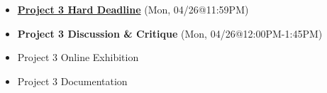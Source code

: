 \def\dMon{Mon, 04/26}
\def\dTues{Tues, 04/27}
\def\dWed{Wed, 04/28}
\def\dThur{Thur, 04/29}
\def\dFri{Fri, 04/30}
\def\dSat{Sat, 05/01}
\def\dSun{Sun, 05/02}
\placeDate





% 
\begin{itemize}[noitemsep,topsep=0pt,leftmargin=*]
    \item \textcolor{defaultColor}{\ul{\textbf{Project 3 Hard Deadline}} (\dMon @11:59PM)}
    \item \textcolor{defaultColor}{\textbf{Project 3 Discussion \& Critique} (\dMon @12:00PM-1:45PM)}
    \item Project 3 Online Exhibition
    \item Project 3 Documentation
\end{itemize}